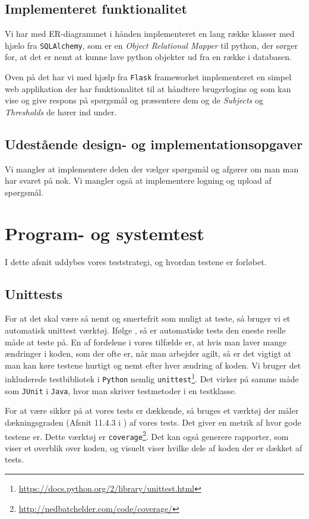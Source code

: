 \documentclass[11pt, a4paper]{article}
\begin{document}
\subsection{Implementeret funktionalitet}
\label{sub:implementeret_funktionalitet}
Vi har med ER-diagrammet i hånden implementeret en lang række klasser med hjælo fra \verb!SQLAlchemy!, som er en \emph{Object Relational Mapper} til python, der sørger for, at det er nemt at kunne lave python objekter ud fra en række i databasen.

Oven på det har vi med hjælp fra \verb!Flask! frameworket implementeret en simpel web applikation der har funktionalitet til at håndtere brugerlogins og som kan vise og give respons på spørgsmål og præsentere dem og de \emph{Subjects} og \emph{Thresholds} de hører ind under.

\subsection{Udestående design- og implementationsopgaver}
\label{sub:udestaende_design_og_implementationsopgaver}

Vi mangler at implementere delen der vælger spørgsmål og afgører om man man har svaret på nok. Vi mangler også at implementere logning og upload af spørgsmål.


\section{Program- og systemtest}
\label{sec:program_og_systemtest}
I dette afsnit uddybes vores teststrategi, og hvordan testene er forløbet.
\subsection{Unittests}
\label{sub:unittests}
For at det skal være så nemt og smertefrit som muligt at teste, så bruger vi et automatisk unittest værktøj. Ifølge \cite{COCO}, så er automatiske tests den eneste reelle måde at teste på. En af fordelene i vores tilfælde er, at hvis man laver mange ændringer i koden, som der ofte er, når man arbejder agilt, så er det vigtigt at man kan køre testene hurtigt og nemt efter hver ændring af koden. Vi bruger det inkluderede testbibliotek i \verb!Python! nemlig \verb!unittest!\footnote{\url{https://docs.python.org/2/library/unittest.html}}. Det virker på samme måde som \verb!JUnit! i \verb!Java!, hvor man skriver testmetoder i en testklasse.

For at være sikker på at vores tests er dækkende, så bruges et værktøj der måler dækningsgraden (Afsnit 11.4.3 i \cite{OOSE})  af vores tests. Det giver en metrik af hvor gode testene er. Dette værktøj er \verb!coverage!\footnote{\url{http://nedbatchelder.com/code/coverage/}}. Det kan også generere rapporter, som viser et overblik over koden, og visuelt viser hvilke dele af koden der er dækket af tests.
\end{document}
